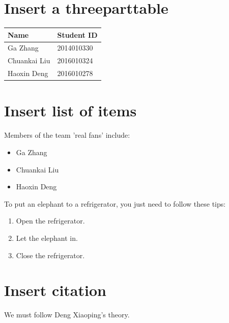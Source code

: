\documentclass{article} %
\begin{document}
\section{Insert a threeparttable} 
\begin{table}[H]
\centering
    \begin{threeparttable}
        \begin{tabular}{ll}
        \toprule
        Name         & Student ID \\
        \midrule
        Ga Zhang     & 2014010330 \\
        Chuankai Liu & 2016010324 \\
        Haoxin Deng  & 2016010278 \\
        \bottomrule
        \end{tabular}
    \end{threeparttable}
\end{table}

\section{Insert list of items}
Members of the team 'real fans' include:
\begin{itemize} %

    \item Ga Zhang
    \item Chuankai Liu
    \item Haoxin Deng
\end{itemize}

To put an elephant to a refrigerator, you just need to follow these tips:
\begin{enumerate} %
    \item Open the refrigerator.
    \item Let the elephant in.
    \item Close the refrigerator.
\end{enumerate}

\section{Insert citation}
We must follow Deng Xiaoping's theory. %



\end{document}
